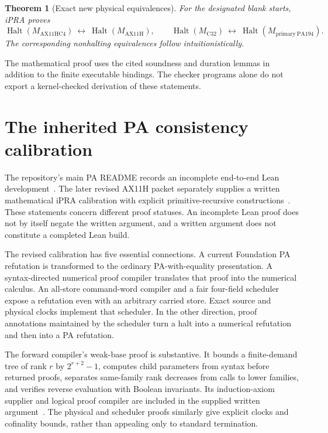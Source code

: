 \documentclass[11pt,letterpaper]{article}
\newtheorem{theorem}{Theorem}[section]
\newcommand{\Ht}{\operatorname{Halt}}
\newcommand{\Mmain}{M_{\mathrm{AX11HC4}}}
\newcommand{\Mcomp}{M_{\mathrm{C32}}}
\begin{document}
\begin{theorem}[Exact new physical equivalences]
For the designated blank starts, iPRA proves
\[
 \Ht(\Mmain)\ \longleftrightarrow\ \Ht(M_{\mathrm{AX11H}}),
 \qquad
 \Ht(\Mcomp)\ \longleftrightarrow\ \Ht(M_{\mathrm{primary\ PA194}}).
\]
The corresponding nonhalting equivalences follow intuitionistically.
\end{theorem}

The mathematical proof uses the cited soundness and duration lemmas in addition to the finite executable bindings. The checker programs alone do not export a kernel-checked derivation of these statements.

\section{The inherited PA consistency calibration}

The repository's main PA README records an incomplete end-to-end Lean development~\cite{pareadme}. The later revised AX11H packet separately supplies a written mathematical iPRA calibration with explicit primitive-recursive constructions~\cite{ax11hclaim,ax11hfinal}. These statements concern different proof statuses. An incomplete Lean proof does not by itself negate the written argument, and a written argument does not constitute a completed Lean build.

The revised calibration has five essential connections. A current Foundation PA refutation is transformed to the ordinary PA-with-equality presentation. A syntax-directed numerical proof compiler translates that proof into the numerical calculus. An all-store command-word compiler and a fair four-field scheduler expose a refutation even with an arbitrary carried store. Exact source and physical clocks implement that scheduler. In the other direction, proof annotations maintained by the scheduler turn a halt into a numerical refutation and then into a PA refutation.

The forward compiler's weak-base proof is substantive. It bounds a finite-demand tree of rank $r$ by $2^{r+2}-1$, computes child parameters from syntax before returned proofs, separates same-family rank decreases from calls to lower families, and verifies reverse evaluation with Boolean invariants. Its induction-axiom supplier and logical proof compiler are included in the supplied written argument~\cite{forward}. The physical and scheduler proofs similarly give explicit clocks and cofinality bounds, rather than appealing only to standard termination.
\end{document}
